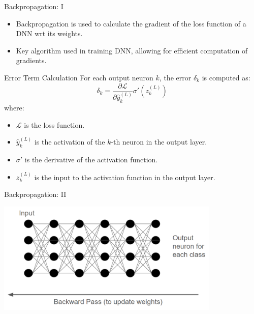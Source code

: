 \documentclass[aspectratio=169]{../latex_main/tntbeamer}  %
\begin{document}
  	\begin{frame}{Backpropagation: I}

        \vspace{-2em}
        \begin{itemize}
            \item Backpropagation is used to calculate the gradient of the loss function of a DNN wrt its weights.
            \item Key algorithm used in training DNN, allowing for efficient computation of gradients.
        \end{itemize}
        
        \begin{block}{Error Term Calculation}
        For each output neuron \( k \), the error \( \delta_k \) is computed as:
        \[
        \delta_k = \frac{\partial \mathcal{L}}{\partial \hat{y}_k^{(L)}} \sigma'(z_k^{(L)})
        \]
        where:
        \begin{itemize}
            \item \( \mathcal{L} \) is the loss function.
            \item \( \hat{y}_k^{(L)} \) is the activation of the \( k \)-th neuron in the output layer.
            \item \( \sigma' \) is the derivative of the activation function.
            \item \( z_k^{(L)} \) is the input to the activation function in the output layer.
        \end{itemize}
        \end{block}

        \end{frame}
  	\begin{frame}{Backpropagation: II}

        \includegraphics[width=0.8\textwidth]{figure/backward.png}

        \end{frame}
\end{document}
